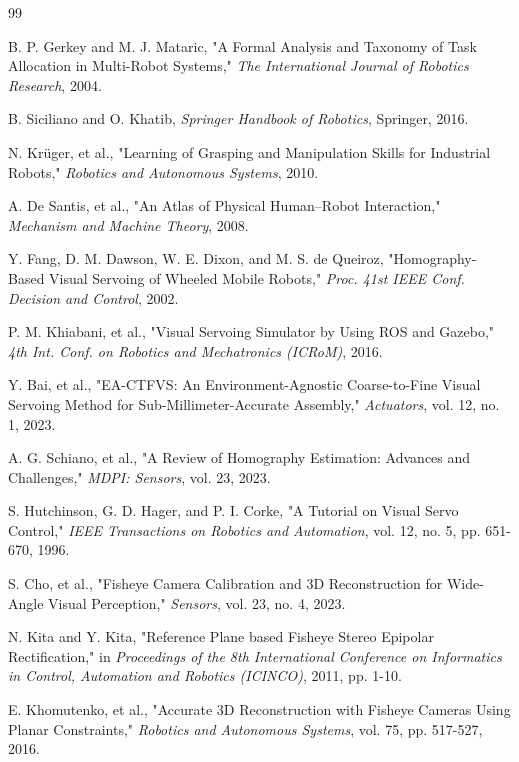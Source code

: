 \begin{thebibliography}{99}

 B. P. Gerkey and M. J. Mataric, "A Formal Analysis and Taxonomy of Task Allocation in Multi-Robot Systems," \textit{The International Journal of Robotics Research}, 2004.

 B. Siciliano and O. Khatib, \textit{Springer Handbook of Robotics}, Springer, 2016.

 N. Kr{\"u}ger, et al., "Learning of Grasping and Manipulation Skills for Industrial Robots," \textit{Robotics and Autonomous Systems}, 2010.

 A. De Santis, et al., "An Atlas of Physical Human--Robot Interaction," \textit{Mechanism and Machine Theory}, 2008.

 Y. Fang, D. M. Dawson, W. E. Dixon, and M. S. de Queiroz, "Homography-Based Visual Servoing of Wheeled Mobile Robots," \textit{Proc. 41st IEEE Conf. Decision and Control}, 2002.

 P. M. Khiabani, et al., "Visual Servoing Simulator by Using ROS and Gazebo," \textit{4th Int. Conf. on Robotics and Mechatronics (ICRoM)}, 2016.

 Y. Bai, et al., "EA-CTFVS: An Environment-Agnostic Coarse-to-Fine Visual Servoing Method for Sub-Millimeter-Accurate Assembly," \textit{Actuators}, vol. 12, no. 1, 2023.

 A. G. Schiano, et al., "A Review of Homography Estimation: Advances and Challenges," \textit{MDPI: Sensors}, vol. 23, 2023.

 S. Hutchinson, G. D. Hager, and P. I. Corke, "A Tutorial on Visual Servo Control," \textit{IEEE Transactions on Robotics and Automation}, vol. 12, no. 5, pp. 651-670, 1996.

 S. Cho, et al., "Fisheye Camera Calibration and 3D Reconstruction for Wide-Angle Visual Perception," \textit{Sensors}, vol. 23, no. 4, 2023.

 N. Kita and Y. Kita, "Reference Plane based Fisheye Stereo Epipolar Rectification," in \textit{Proceedings of the 8th International Conference on Informatics in Control, Automation and Robotics (ICINCO)}, 2011, pp. 1-10.

 E. Khomutenko, et al., "Accurate 3D Reconstruction with Fisheye Cameras Using Planar Constraints," \textit{Robotics and Autonomous Systems}, vol. 75, pp. 517-527, 2016.   


\end{thebibliography}
